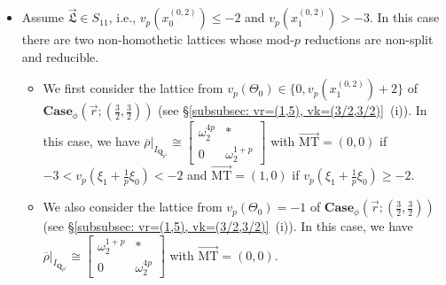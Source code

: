 \documentclass[11pt]{amsart}
\theoremstyle{definition}
\numberwithin{equation}{subsection}
\theoremstyle{plain}
\theoremstyle{plain}
\theoremstyle{plain}
\theoremstyle{plain}
\theoremstyle{plain}
\theoremstyle{plain}
\theoremstyle{plain}
\theoremstyle{plain}
\theoremstyle{plain}
\theoremstyle{plain}
\theoremstyle{plain}
\theoremstyle{plain}
\theoremstyle{definition}
\theoremstyle{definition}
\theoremstyle{definition}
\theoremstyle{remark}
\renewcommand{\(}{\textup{(}}
\renewcommand{\)}{\textup{)}}
\newcommand{\Q}{\mathbf{Q}}
\newcommand{\rhobar}{\overline{\rho}}
\newcommand{\fL}{\mathfrak{L}}
\newcommand{\vr}{\vec{r}}
\newcommand{\vL}{\vec{\fL}}
\newcommand{\IQptwo}{{I_{\Q_{p^2}}}}
\begin{document}
\begin{itemize}[leftmargin=*]
\item Assume $\vL\in S_{11}$, i.e., $v_p(x_0^{(0,2)})\leq -2$ and $v_p(x_1^{(0,2)})>-3$. In this case there are two non-homothetic lattices whose mod-$p$ reductions are non-split and reducible.
\begin{itemize}[leftmargin=*]
    \item We first consider the lattice from $v_p(\Theta_0)\in\{0,v_p(x_1^{(0,2)})+2\}$ of $\mathbf{Case}_\phi(\vr;(\frac{3}{2},\frac{3}{2}))$ (see \S\ref{subsubsec: vr=(1,5), vk=(3/2,3/2)}~(i)). In this case, we have $\rhobar|_\IQptwo\cong
    \begin{bmatrix}
        \omega_2^{4p} & * \\ 0 & \omega_2^{1+p}
    \end{bmatrix}$ with $\vec{\mathrm{MT}}=(0,0)$ if $-3<v_p(\xi_1+\frac{1}{p}\xi_0)<-2$ and $\vec{\mathrm{MT}}=(1,0)$ if $v_p(\xi_1+\frac{1}{p}\xi_0)\geq -2$.
    \item We also consider the lattice from $v_p(\Theta_0)=-1$ of $\mathbf{Case}_\phi(\vr;(\frac{3}{2},\frac{3}{2}))$ (see \S\ref{subsubsec: vr=(1,5), vk=(3/2,3/2)}~(i)). In this case, we have $\rhobar|_\IQptwo\cong
    \begin{bmatrix}
        \omega_2^{1+p} & * \\ 0 & \omega_2^{4p}
    \end{bmatrix}$ with $\vec{\mathrm{MT}}=(0,0)$.
\end{itemize}


\end{itemize}
\end{document}
